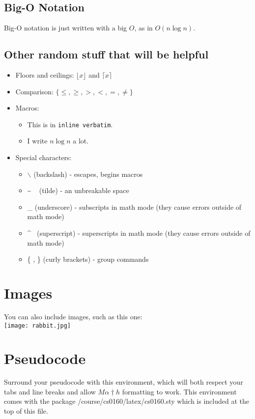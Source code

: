 \documentclass[11pt]{article}			%
\begin{document}
\subsection{Big-O Notation}
Big-O notation is just written with a big $O$, as in $O(n\log n)$.


\subsection{Other random stuff that will be helpful}
\begin{itemize}
\item Floors and ceilings: $\lfloor x \rfloor$ and $\lceil x \rceil$
\item Comparison: $\{\leq, \geq, >, <, =, \neq\}$
\item Macros: 
\begin{itemize}
 \item This is in \verb|inline verbatim|.
 \item I write $n \log n$  a lot.
\end{itemize}
\item Special characters:
\begin{itemize}
 \item $\backslash$ (backslash) - escapes, begins macros
 \item \~ ~%
(tilde) - an unbreakable space
 \item \_ (underscore) - subscripts in math mode (they cause errors outside of math mode)
 \item \^ ~(superscript) - superscripts in math mode (they cause errors outside of math mode)
 \item \{ , \} (curly brackets) - group commands
\end{itemize}

\end{itemize}

\section{Images}
You can also include images, such as this one:\\
\texttt{[image: rabbit.jpg]}

\section{Pseudocode}
\begin{pseudo}
Surround your pseudocode with
    this environment, which will both respect your tabs and line breaks
        and allow $M \alpha \dagger h$ formatting to work.
            This environment comes with the package 
                /course/cs0160/latex/cs0160.sty
                    which is included at the top of this file.
\end{pseudo}
\end{document}
